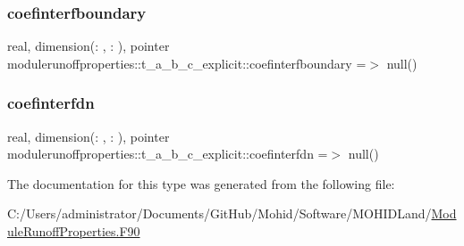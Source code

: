 \subsubsection{\texorpdfstring{coefinterfboundary}{coefinterfboundary}}
{\footnotesize\ttfamily real, dimension(\+: , \+: ), pointer modulerunoffproperties\+::t\+\_\+a\+\_\+b\+\_\+c\+\_\+explicit\+::coefinterfboundary =$>$ null()\hspace{0.3cm}{\ttfamily [private]}}

\mbox{\label{structmodulerunoffproperties_1_1t__a__b__c__explicit_a56ffb9f93b06e5584da96f66f2759de1}} 
\subsubsection{\texorpdfstring{coefinterfdn}{coefinterfdn}}
{\footnotesize\ttfamily real, dimension(\+: , \+: ), pointer modulerunoffproperties\+::t\+\_\+a\+\_\+b\+\_\+c\+\_\+explicit\+::coefinterfdn =$>$ null()\hspace{0.3cm}{\ttfamily [private]}}



The documentation for this type was generated from the following file\+:\begin{DoxyCompactItemize}
\item 
C\+:/\+Users/administrator/\+Documents/\+Git\+Hub/\+Mohid/\+Software/\+M\+O\+H\+I\+D\+Land/\mbox{\hyperlink{_module_runoff_properties_8_f90}{Module\+Runoff\+Properties.\+F90}}\end{DoxyCompactItemize}
